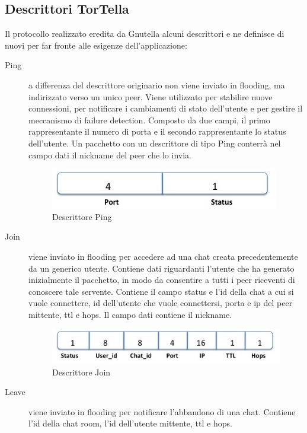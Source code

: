 \subsection{Descrittori TorTella}
Il protocollo realizzato eredita da Gnutella alcuni descrittori e ne definisce di nuovi per far fronte alle esigenze dell’applicazione:
\begin{description}
\item[Ping] a differenza del descrittore originario non viene inviato in flooding, ma indirizzato verso un unico peer. Viene utilizzato per stabilire nuove connessioni, per notificare i cambiamenti di stato dell'utente e per gestire il meccanismo di failure detection. Composto da due campi, il primo rappresentante il numero di porta e il secondo rappresentante lo status dell’utente. Un pacchetto con un descrittore di tipo Ping conterrà nel campo dati il nickname del peer che lo invia.
\begin{figure}[H]
\begin{center}
\includegraphics[scale=0.7]{etc/ping.jpg}
\caption{Descrittore Ping}
\label{ping}
\end{center}
\end{figure}
\item[Join] viene inviato in flooding per accedere ad una chat creata precedentemente da un generico utente. Contiene dati riguardanti l'utente che ha generato inizialmente il pacchetto, in modo da consentire a tutti i peer riceventi di conoscere tale servente. Contiene il campo status e l’id della chat a cui si vuole connettere, id dell'utente che vuole connettersi, porta e ip del peer mittente, ttl e hops. Il campo dati contiene il nickname.
\begin{figure}[H]
\begin{center}
\includegraphics[scale=0.7]{etc/join.jpg}
\caption{Descrittore Join}
\label{join}
\end{center}
\end{figure}
\item[Leave] viene inviato in flooding per notificare l'abbandono di una chat. Contiene l’id della chat room, l'id dell'utente mittente, ttl e hops.

\end{description}
